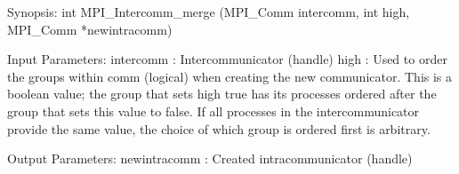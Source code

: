 Synopsis:
int MPI_Intercomm_merge
   (MPI_Comm intercomm, int high, 
    MPI_Comm *newintracomm)

Input Parameters:
intercomm : Intercommunicator (handle)
high : Used to order the groups within comm (logical) when creating the new
    communicator. This is a boolean value; the group that sets high true
    has its processes ordered after the group that sets this value to
    false. If all processes in the intercommunicator provide the same
    value, the choice of which group is ordered first is arbitrary.

Output Parameters:
newintracomm : Created intracommunicator (handle)
